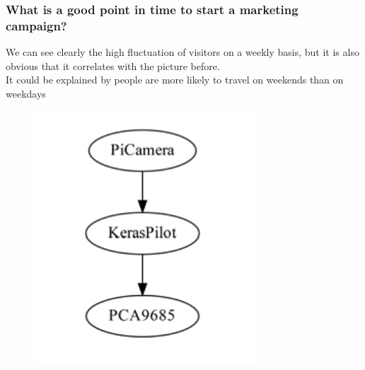\documentclass{beamer}
\begin{document}
\begin{frame}
\frametitle{What is a good point in time to start a marketing campaign?}
We can see clearly the high fluctuation of visitors on a weekly basis, but it is also obvious that it correlates with the picture before.\\It could be explained by people are more likely to travel on weekends than on weekdays
\begin{figure}
\includegraphics[width=0.8\linewidth]{photo/autonom}
\end{figure}
\end{frame}
\end{document}
